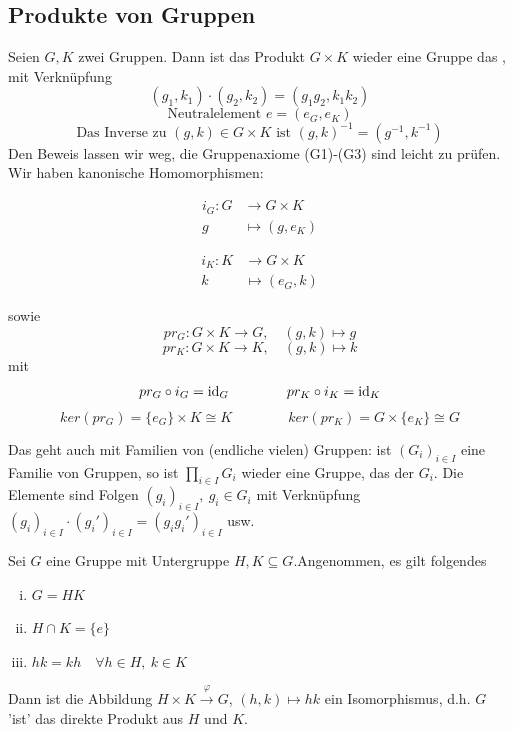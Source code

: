 \subsection{Produkte von Gruppen}
\label{sub:produkte}
Seien $G,K$ zwei Gruppen. Dann ist das Produkt $G\times K$ wieder eine Gruppe das , mit Verknüpfung \[(g_1,k_1)\cdot(g_2,k_2)=(g_1g_2,k_1k_2) \]
\[\text{Neutralelement } e=(e_G,e_K) \]
\[\text{Das Inverse zu }(g,k)\in G\times K \text{ ist }(g,k)^{-1}=(g^{-1},k^{-1})\]
Den Beweis lassen wir weg, die Gruppenaxiome (G1)-(G3) sind leicht zu prüfen.\\
Wir haben kanonische Homomorphismen:\\
\begin{minipage}[c]{8cm}
	\begin{equation*}
	\begin{aligned}
		i_G: G &\to G\times K\\
		g &\mapsto (g,e_K)
	\end{aligned}
	\end{equation*}
\end{minipage}
\begin{minipage}[c]{8cm}
	\begin{equation*}
	\begin{aligned}
	i_K: K &\to G\times K\\
	k &\mapsto (e_G,k)
	\end{aligned}
	\end{equation*}
\end{minipage}
sowie \[pr_G:G\times K \to G,\quad (g,k)\mapsto g \]
\[pr_K:G\times K \to K,\quad (g,k)\mapsto k \]
mit \[pr_G\circ i_G=\operatorname{id}_G \qquad\qquad pr_K\circ i_K=\operatorname{id}_K \]
\[ ker(pr_G)=\{e_G\}\times K\cong K \qquad\qquad ker(pr_K)=G\times \{e_K\}\cong G \]

Das geht auch mit Familien von (endliche vielen) Gruppen: ist $(G_i)_{i\in I}$ eine Familie von Gruppen, so ist $\prod\limits_{i\in I}G_i$ wieder eine Gruppe, das  der $G_i$. Die Elemente sind Folgen $(g_i)_{i\in I},~g_i\in G_i$ mit Verknüpfung $(g_i)_{i\in I}\cdot (g_i')_{i\in I}=(g_ig_i')_{i\in I}$ usw.\\
\newpage

Sei $G$ eine Gruppe mit Untergruppe $H,K\subseteq G$.Angenommen, es gilt folgendes
\begin{enumerate}[(i)]
	\item $G=HK$
	\item $H\cap K=\{e\}$
	\item $hk=kh\quad \forall h\in H,~k\in K$
\end{enumerate}
Dann ist die Abbildung $H\times K \stackrel{\varphi}{\to} G$, $(h,k)\mapsto hk$ ein Isomorphismus, d.h. $G$ 'ist' das direkte Produkt aus $H$ und $K$.

